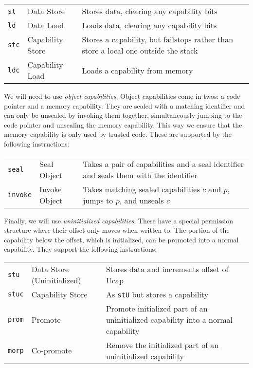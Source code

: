 \documentclass{article}
\begin{document}
\begin{tabular}{l l l}
  {\tt st}      & Data Store       & Stores data, clearing any capability bits \\
  {\tt ld}      & Data Load        & Loads data, clearing any capability bits \\
  {\tt stc}     & Capability Store & Stores a capability, but failstops rather than store
                                     a local one outside the stack \\
  {\tt ldc}     & Capability Load  & Loads a capability from memory \\
\end{tabular}

We will need to use {\em object capabilities}. Object capabilities come in twos:
a code pointer and a memory capability. They are sealed with a matching identifier and
can only be unsealed by invoking them together, simultaneously jumping to the code pointer
and unsealing the memory capability. This way we ensure that the memory capability is
only used by trusted code. These are supported by the following instructions:

\begin{tabular}{l l l}
  {\tt seal}   & Seal Object    & Takes a pair of capabilities and a seal identifier and
                                  seals them with the identifier \\
  {\tt invoke} & Invoke Object  & Takes matching sealed capabilities \(c\) and
                                  \(p\), jumps to \(p\), and unseals \(c\) \\
\end{tabular}

Finally, we will use {\em uninitialized capabilities}. These have a special permission structure
where their offset only moves when written to. The portion of the capability below the offset,
which is initialized, can be promoted into a normal capability. They support the following
instructions:

\begin{tabular}{l l l}
  {\tt stu}  & Data Store (Uninitialized) & Stores data and increments offset of Ucap \\
  {\tt stuc} & Capability Store           & As {\tt stU} but stores a capability \\
  {\tt prom} & Promote                    & Promote initialized part of an uninitialized capability
                                            into a normal capability \\
  {\tt morp} & Co-promote                 & Remove the initialized part of an uninitialized capability \\
\end{tabular}
\end{document}
